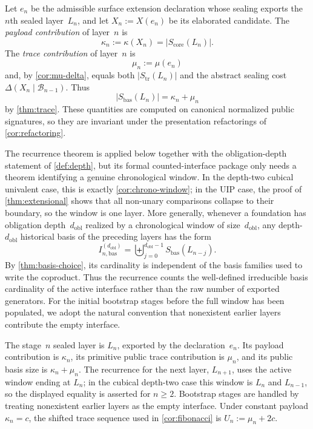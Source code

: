 \documentclass{lmcs}
\newcommand{\B}{\mathcal{B}}
\begin{document}
\begin{defi}
\label{def:layerwise-mu-kappa}
Let $e_n$ be the admissible surface extension declaration whose sealing exports the $n$th sealed layer~$L_n$, and let $X_n:=X(e_n)$ be its elaborated candidate. The \emph{payload contribution} of layer~$n$ is
\[
  \kappa_n := \kappa(X_n)=|S_{\mathrm{core}}(L_n)|.
\]
The \emph{trace contribution} of layer~$n$ is
\[
  \mu_n := \mu(e_n)
\]
and, by \autoref{cor:mu-delta}, equals both $|S_{\mathrm{tr}}(L_n)|$ and the abstract sealing cost $\Delta(X_n\mid\B_{n-1})$. Thus
\[
  |S_{\mathrm{bas}}(L_n)|=\kappa_n+\mu_n
\]
by \autoref{thm:trace}. These quantities are computed on canonical normalized public signatures, so they are invariant under the presentation refactorings of \autoref{cor:refactoring}.
\end{defi}

The recurrence theorem is applied below together with the obligation-depth statement of \autoref{def:depth}, but its formal counted-interface package only needs a theorem identifying a genuine chronological window. In the depth-two cubical univalent case, this is exactly \autoref{cor:chrono-window}; in the UIP case, the proof of \autoref{thm:extensional} shows that all non-unary comparisons collapse to their boundary, so the window is one layer. More generally, whenever a foundation has obligation depth~$d_{\mathrm{obl}}$ realized by a chronological window of size~$d_{\mathrm{obl}}$, any depth-$d_{\mathrm{obl}}$ historical basis of the preceding layers has the form
\[
  I_{n,\mathrm{bas}}^{(d_{\mathrm{obl}})} = \biguplus_{j=0}^{d_{\mathrm{obl}}-1} S_{\mathrm{bas}}(L_{n-j}).
\]
By \autoref{thm:basis-choice}, its cardinality is independent of the basis families used to write the coproduct. Thus the recurrence counts the well-defined irreducible basis cardinality of the active interface rather than the raw number of exported generators. For the initial bootstrap stages before the full window has been populated, we adopt the natural convention that nonexistent earlier layers contribute the empty interface.

\begin{rem}
\label{rem:indexing-convention}
The stage~$n$ sealed layer is $L_n$, exported by the declaration~$e_n$. Its payload contribution is $\kappa_n$, its primitive public trace contribution is $\mu_n$, and its public basis size is $\kappa_n+\mu_n$. The recurrence for the next layer, $L_{n+1}$, uses the active window ending at $L_n$; in the cubical depth-two case this window is $L_n$ and $L_{n-1}$, so the displayed equality is asserted for $n\geq2$. Bootstrap stages are handled by treating nonexistent earlier layers as the empty interface. Under constant payload $\kappa_n=c$, the shifted trace sequence used in \autoref{cor:fibonacci} is $U_n:=\mu_n+2c$.
\end{rem}
\end{document}
